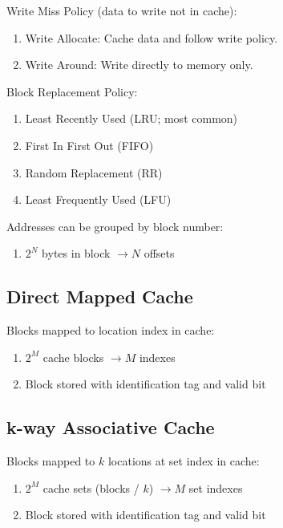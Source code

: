 \documentclass[12pt, a4paper]{article}
\begin{document}
\begin{multicols*}{3}
Write Miss Policy (data to write not in cache):
\begin{enumerate}[\roman*.]
  \item Write Allocate: Cache data and follow write policy. 
  \item Write Around: Write directly to memory only.
\end{enumerate}

Block Replacement Policy:
\begin{enumerate}[\roman*.]
  \item Least Recently Used (LRU; most common)
  \item First In First Out (FIFO)
  \item Random Replacement (RR)
  \item Least Frequently Used (LFU)
\end{enumerate}

Addresses can be grouped by block number:
\begin{enumerate}[\roman*.]
  \item $2^N$ bytes in block $\rightarrow N$ offsets
\end{enumerate}
{\centering{}\par}

\subsection{Direct Mapped Cache}
Blocks mapped to location index in cache:
\begin{enumerate}[\roman*.]
  \item $2^M$ cache blocks $\rightarrow M$ indexes
  \item Block stored with identification tag and valid bit
\end{enumerate}
{\centering{}\par}

\subsection{k-way Associative Cache}
Blocks mapped to $k$ locations at set index in cache: 
\begin{enumerate}[\roman*.]
  \item $2^M$ cache sets (blocks / $k$) $\rightarrow M$ set indexes
  \item Block stored with identification tag and valid bit 
\end{enumerate}
{\centering{}\par}


\end{multicols*}
\end{document}
